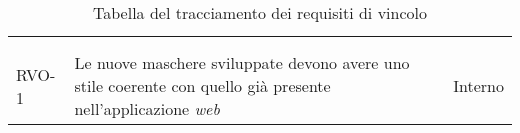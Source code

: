 \begin{center}
  {
    \renewcommand{\arraystretch}{1}
    \begin{longtable}{
      |>{\centering\arraybackslash}p{60pt}
      |>{\centering\arraybackslash}p{220pt}
      |>{\centering\arraybackslash}p{60pt}|}

      \rowcolor{antimaincolor!0}
      \caption{\label{tab:requisiti-vincolo}Tabella del tracciamento dei
      requisiti di vincolo}                                                                                                 \\

      \hline
      \rowcolor{maincolor}
      \color{antimaincolor}{Requisito}
                                                                      &
      \color{antimaincolor}{Descrizione}
                                                                      &
      \color{antimaincolor}{Fonte}
      \\
      \hline
      \endhead

      \rowcolor{maincolor}
      \color{antimaincolor}{Requisito}
                                                                      &
      \color{antimaincolor}{Descrizione}
                                                                      &
      \color{antimaincolor}{Fonte}
      \\
      \hline
      \endfoot

      RVO-1                                                           & Le nuove maschere sviluppate devono avere uno stile
      coerente con quello già presente nell'applicazione \textit{web} & Interno                                             \\
      \hline

    \end{longtable}
    \renewcommand{\arraystretch}{1}
  }

\end{center}